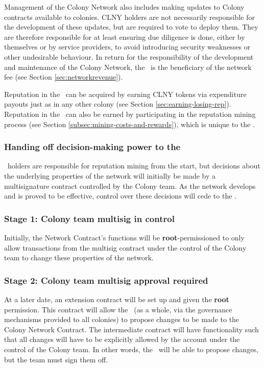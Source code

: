 Management of the Colony Network also includes making updates to Colony contracts available to colonies. CLNY holders are not necessarily responsible for the development of these updates, but are required to vote to deploy them. They are therefore responsible for at least ensuring due diligence is done, either by themselves or by service providers, to avoid introducing security weaknesses or other undesirable behaviour. In return for the responsibility of the development and maintenance of the Colony Network, the \rc\ is the beneficiary of the network fee (see Section \ref{sec:networkrevenue}).

Reputation in the \rc\ can be acquired by earning CLNY tokens via expenditure payouts just as in any other colony (see Section \ref{sec:earning-losing-rep}). Reputation in the \rc\ can also be earned by participating in the reputation mining process (see Section \ref{subsec:mining-costs-and-rewards}), which is unique to the \rc.

\subsubsection{Handing off decision-making power to the \rc}\label{subsec:ceding-control-to-rc}

\rct\ holders are responsible for reputation mining from the start, but decisions about the underlying properties of the network will initially be made by a multisignature contract controlled by the Colony team. As the network develops and is proved to be effective, control over these decisions will cede to the \rc.

\subsubsection*{Stage 1: Colony team multisig in control}
 Initially, the Network Contract's functions will be \textbf{root}-permissioned to only allow transactions from the multisig contract under the control of the Colony team to change these properties of the network.

\subsubsection*{Stage 2: Colony team multisig approval required}
At a later date, an extension contract will be set up and given the \textbf{root} permission. This contract will allow the \rc\ (as a whole, via the governance mechanisms provided to all colonies) to propose changes to be made to the Colony Network Contract. The intermediate contract will have functionality such that all changes will have to be explicitly allowed by the account under the control of the Colony team. In other words, the \rc\ will be able to propose changes, but the team must sign them off.

